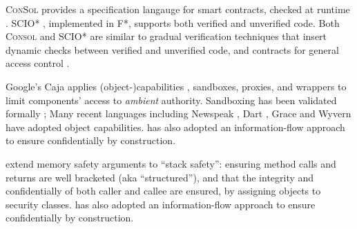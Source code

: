 \textsc{ConSol} \cite{consolidating-pldi2024}
provides a specification langauge for smart contracts,
checked at runtime \cite{FinFel01}.
SCIO* \cite{secure-io-fstar-popl2024}, implemented in
F*, supports both
verified and unverified code.
Both \textsc{Consol} and SCIO* are 
similar to gradual verification techniques 
\cite{gradual-verification-popl2024,Cok2022} that
insert dynamic checks between verified and unverified code,
and contracts for general access control 
\cite{DPCC14,AuthContract,cedar-oopsla2024}.




Google's Caja \cite{Caja} applies (object-)capabilities \cite{Dennis66,JamesMorris,MillerPhD}, 
sandboxes, proxies, and wrappers to limit components'
access to \textit{ambient} authority.
Sandboxing has been validated
formally \cite{mmt-oakland10};
Many recent languages %
\cite{CapJavaHayesAPLAS17,CapNetSocc17Eide,DOCaT14} including Newspeak
\cite{newspeak17}, Dart \cite{dart15}, Grace \cite{grace,graceClasses}
and Wyvern \cite{wyverncapabilities} have adopted object capabilities.
\citet{schaeferCbC} has also adopted
an information-flow approach to ensure confidentially by construction.

\citet{stack-safety-csf2023} extend memory safety arguments to ``stack
safety'': ensuring method calls and returns are well bracketed (aka
``structured''), and that the integrity and confidentially of both
caller and callee are ensured, by assigning objects to security
classes. 
\citet{schaeferCbC} has also adopted
an information-flow approach to ensure confidentially by construction.


 
 
 
